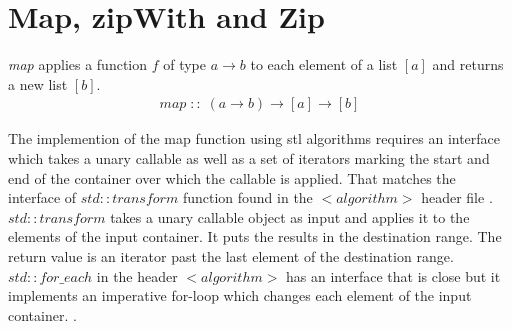 \documentclass[12pt,fleqn]{article}
\begin{document}
 
%
\section*{Map, zipWith and Zip}
%
%
{\em map} applies a function $f$ of type $a \rightarrow b$ to each element of a list $[a]$ and returns a new list $[b]$. 
\begin{eqnarray*}
map \;::\; (a \rightarrow b) \rightarrow [a] \rightarrow [b]
\end{eqnarray*}

The implemention of the map function using stl algorithms requires an interface which takes a unary callable as well as a set of iterators marking the start and end of the container over which the callable is applied.
That matches the interface of $std::transform$ function found in the $<algorithm>$ header file \cite{josuttis, std::transform}.
$std::transform$ takes a unary callable object as input and applies it to the elements of the input container.
It puts the results in the destination range. 
The return value is an iterator past the last element of the destination range. 
\newline
%
$std::for\_each$ in the header $<algorithm>$ has an interface that is close but it implements an imperative for-loop which  changes each element of the input container.
\cite{std::foreach, josuttis}.
\begin{comment}
\[
\begin{array}{rll}
\mbox{\bf template}<&\mbox{\bf typename}\; input\_container\_iterator, \\
               &\mbox{\bf typename} \; output \_container\_iterator, \\
             &\mbox{\bf typename} \; unary\_operation >&\\
output\_container\_iterator\;& \mbox{\bf transform}\\
&( input\_container\_iterator\; begin_1, \\
& input\_container\_iterator \; end_1, \\
& output\_container\_iterator \; destination_1, \\
& unary\_operation \; unary_{op} );
\end{array}
\]
\end{comment}
\end{document}
